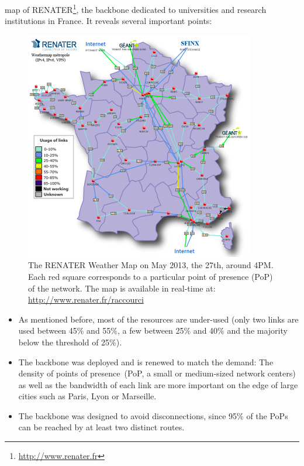 map of RENATER\footnote{\href{http://www.renater.fr}{http://www.renater.fr}}, the backbone dedicated to universities and research
institutions in France. It reveals several important points: 
\begin{figure}[b]
\vspace*{-.3cm}
\includegraphics[width=10cm]{./FIGS/renater.png}
\centering\caption{The RENATER Weather Map on May 2013, the 27th, around 4PM.
Each red square corresponds to a particular point of presence (PoP) of the network. The map is available in real-time
at: \href{http://www.renater.fr/raccourci}{http://www.renater.fr/raccourci}}
\label{fig:renater}
\vspace*{-.3cm}
\end{figure}


\begin{itemize} 
\item As mentioned before, most of the resources are under-used (only two links are used between 45\% and 55\%, a few between 25\% and 40\% and the majority below the threshold of 25\%). 
\item The backbone was deployed and is renewed to match the demand: The density of
points of presence~(PoP, \ie a small or medium-sized network centers) as well as the bandwidth of each link are more important on the edge of large cities such as Paris, Lyon or
Marseille. 
\item The backbone was designed to avoid disconnections, since 95\% of the PoPs can be reached by at least two distinct routes.
\end{itemize}



